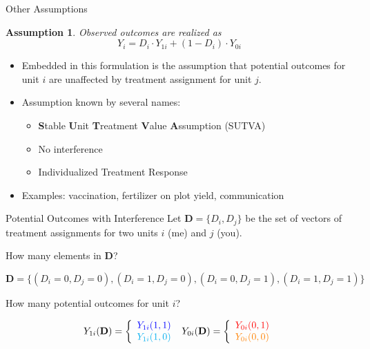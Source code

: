 \documentclass{beamer}
\newtheorem{assumption}{Assumption}
\numberwithin{equation}{section}
\begin{document}
\begin{frame}{Other Assumptions}
\small
\begin{assumption}
Observed outcomes are realized as
\[
Y_i = D_i\cdot Y_{1i} + (1-D_i)\cdot Y_{0i}
\]
\end{assumption}
\pause
\begin{itemize}
\itemsep1pt\parskip0pt
\item
  Embedded in this formulation is the assumption that potential outcomes
  for unit $i$ are unaffected by treatment assignment for unit $j$.
\end{itemize}

\begin{itemize}
\itemsep1pt\parskip0pt
\item
  Assumption known by several names:

  \begin{itemize}
  \itemsep1pt\parskip0pt
  \item
    \textbf{S}table \textbf{U}nit \textbf{T}reatment \textbf{V}alue
    \textbf{A}ssumption (SUTVA)
  \item
    No interference
  \item
    Individualized Treatment Response
  \end{itemize}\medskip
\item
  Examples: vaccination, fertilizer on plot yield, communication
\end{itemize}

\end{frame}

\begin{frame}{Potential Outcomes with Interference}
\small
Let $\mathbf{D}=\{D_i,D_j\}$ be the set of vectors of treatment assignments for
two units $i$ (me) and $j$ (you).\\\medskip

How many elements in $\mathbf{D}$?

\pause

\[
\mathbf{D}=\{(D_i=0,D_j=0),(D_i=1,D_j=0),(D_i=0,D_j=1),(D_i=1,D_j=1)\}
\]

\pause

How many potential outcomes for unit $i$? 

\pause

\begin{small}
\[
Y_{1i}(\mathbf{D}) = \left\{
 \begin{array}{l}
  \textcolor{blue}{Y_{1i}(1,1)} \\
  \textcolor{cyan}{Y_{1i}(1,0)}
 \end{array}
 \right.\,\,
Y_{0i}(\mathbf{D}) = \left\{
 \begin{array}{l}
  \textcolor{red}{Y_{0i}(0,1)} \\
  \textcolor{orange}{Y_{0i}(0,0)}
 \end{array}
 \right.
\]
\end{small}

\end{frame}
\end{document}
